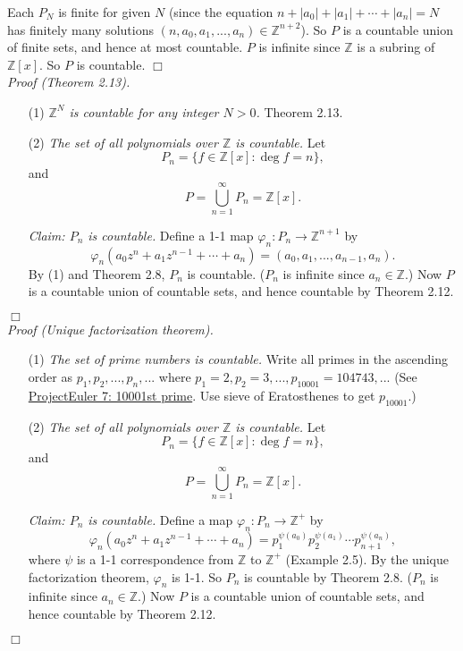 \documentclass{article}
\begin{document}
Each $P_N$ is finite for given $N$
(since the equation $n + |a_0| + |a_1| + \cdots + |a_n| = N$
has finitely many solutions
$(n, a_0, a_1, ..., a_n) \in \mathbb{Z}^{n+2}$).
So $P$ is a countable union of finite sets, and hence at most countable.
$P$ is infinite since $\mathbb{Z}$ is a subring of $\mathbb{Z}[x]$.
So $P$ is countable.
$\Box$ \\

\emph{Proof (Theorem 2.13).}
\begin{enumerate}
\item[(1)]
\emph{$\mathbb{Z}^N$ is countable for any integer $N > 0$.}
Theorem 2.13.
\item[(2)]
\emph{The set of all polynomials over $\mathbb{Z}$ is countable.}
Let
$$P_n = \{ f \in \mathbb{Z}[x] : \deg f = n \},$$
and
$$P = \bigcup_{n = 1}^{\infty} P_n = \mathbb{Z}[x].$$

\emph{Claim: $P_n$ is countable.}
Define a 1-1 map $\varphi_n: P_n \rightarrow \mathbb{Z}^{n+1}$ by
$$\varphi_n(a_0 z^n + a_1 z^{n-1} + \cdots + a_n)
= (a_0, a_1, ..., a_{n-1}, a_n).$$
By (1) and Theorem 2.8, $P_n$ is countable.
($P_n$ is infinite since $a_n \in \mathbb{Z}$.)
Now $P$ is a countable union of countable sets,
and hence countable by Theorem 2.12.
\end{enumerate}
$\Box$ \\

\emph{Proof (Unique factorization theorem).}
\begin{enumerate}
\item[(1)]
\emph{The set of prime numbers is countable.}
Write all primes in the ascending order as $p_1, p_2, ..., p_n, ...$
where $p_1 = 2, p_2 = 3, ..., p_{10001} = 104743, ...$
(See \href{https://projecteuler.net/problem=7}{ProjectEuler 7: 10001st prime}.
Use sieve of Eratosthenes to get $p_{10001}$.)
\item[(2)]
\emph{The set of all polynomials over $\mathbb{Z}$ is countable.}
Let
$$P_n = \{ f \in \mathbb{Z}[x] : \deg f = n \},$$
and
$$P = \bigcup_{n = 1}^{\infty} P_n = \mathbb{Z}[x].$$

\emph{Claim: $P_n$ is countable.}
Define a map $\varphi_n: P_n \rightarrow \mathbb{Z}^+$ by
$$\varphi_n(a_0 z^n + a_1 z^{n-1} + \cdots + a_n)
= p_1^{\psi(a_0)} p_2^{\psi(a_1)} \cdots p_{n+1}^{\psi(a_n)},$$
where $\psi$ is a 1-1 correspondence from $\mathbb{Z}$ to $\mathbb{Z}^+$ (Example 2.5).
By the unique factorization theorem, $\varphi_n$ is 1-1.
So $P_n$ is countable by Theorem 2.8.
($P_n$ is infinite since $a_n \in \mathbb{Z}$.)
Now $P$ is a countable union of countable sets,
and hence countable by Theorem 2.12.
\end{enumerate}
$\Box$ \\\\
\end{document}
